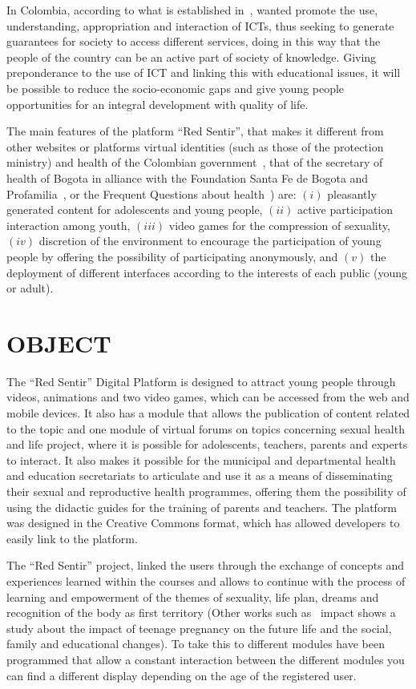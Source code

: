 \documentclass[journal,transmag]{IEEEtran}
\begin{document}
In Colombia, according to what is established in~\cite{Plan2014}, wanted promote the use, understanding, appropriation and interaction of ICTs, thus seeking to generate guarantees for society to access different services, doing in this way that the people of the country can be an active part of society of knowledge. Giving preponderance to the use of ICT and linking this with educational issues, it will be possible to reduce the socio-economic gaps and give young people opportunities for an integral development with quality of life. 

The main features of the platform ``Red Sentir'', that makes it different from other websites or platforms virtual identities (such as those of the protection ministry) and health of the Colombian government~\cite{PagGob2018}, that of the secretary of health of Bogota in alliance with the Foundation Santa Fe de Bogota and Profamilia~\cite{Sexperto2018}, or the Frequent Questions about health~\cite{1DOC3}) are: $(i)$ pleasantly generated content for adolescents and young people, $(ii)$ active participation interaction among youth, $(iii)$ video games for the compression of sexuality, $(iv)$ discretion of the environment to encourage the participation of young people by offering the possibility of participating anonymously, and $(v)$ the deployment of different interfaces according to the interests of each public (young or adult).

\section{OBJECT}\label{sec:propositos}

The ``Red Sentir'' Digital Platform is designed to attract young people through videos, animations and two video games, which can be accessed from the web and mobile devices. It also has a module that allows the publication of content related to the topic and one module of virtual forums on topics concerning sexual health and life project, where it is possible for adolescents, teachers, parents and experts to interact. It also makes it possible for the municipal and departmental health and education secretariats to articulate and use it as a means of disseminating their sexual and reproductive health programmes, offering them the possibility of using the didactic guides for the training of parents and teachers. The platform was designed in the Creative Commons format, which has allowed developers to easily link to the platform.

The ``Red Sentir'' project, linked the users through the exchange of concepts and experiences learned within the courses and allows to continue with the process of learning and empowerment of the themes of sexuality, life plan, dreams and recognition of the body as first territory (Other works such as~\cite{zeck2007impact} impact shows a study about the impact of teenage pregnancy on the future life and the social, family and educational changes). To take this to different modules have been programmed that allow a constant interaction between the different modules you can find a different display depending on the age of the registered user.
\end{document}
